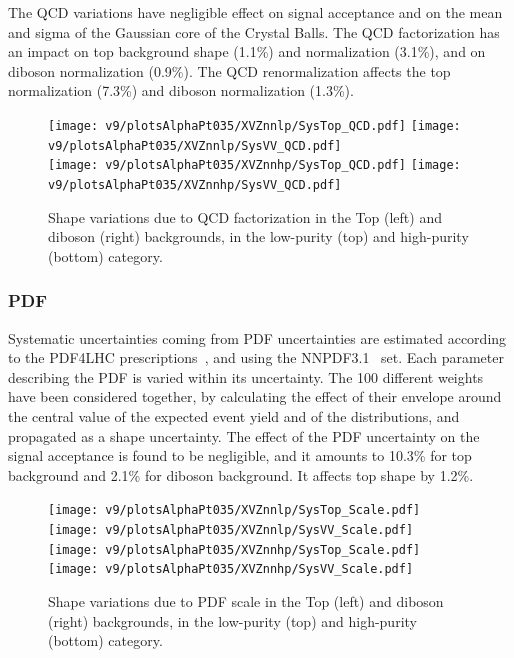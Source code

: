 \noindent The QCD variations have negligible effect on signal acceptance and on the mean and sigma of the Gaussian core of the Crystal Balls. The QCD factorization has an impact on top background shape (1.1\%) and normalization (3.1\%), and on diboson normalization (0.9\%). The QCD renormalization affects the top normalization (7.3\%) and diboson normalization (1.3\%).

 \begin{figure}[!htb]
   \begin{center}
     \texttt{[image: v9/plotsAlphaPt035/XVZnnlp/SysTop\_QCD.pdf]}
     \texttt{[image: v9/plotsAlphaPt035/XVZnnlp/SysVV\_QCD.pdf]}
     \\
     \texttt{[image: v9/plotsAlphaPt035/XVZnnhp/SysTop\_QCD.pdf]}
     \texttt{[image: v9/plotsAlphaPt035/XVZnnhp/SysVV\_QCD.pdf]}

   \end{center}
   \caption{Shape variations due to QCD factorization in the Top (left) and diboson (right) backgrounds, in the low-purity (top) and high-purity (bottom) category.}
   \label{fig:sysScale}
 \end{figure}


\subsubsection{PDF}

Systematic uncertainties coming from PDF uncertainties are estimated according to the PDF4LHC prescriptions~\cite{Butterworth:2015oua}, and using the NNPDF3.1~\cite{Ball:2017nwa} set. Each parameter describing the PDF is varied within its uncertainty. The 100 different weights have been considered together, by calculating the effect of their envelope around the central value of the expected event yield and of the \mtVZ distributions, and propagated as a shape uncertainty. The effect of the PDF uncertainty on the signal acceptance is found to be negligible, and it amounts to 10.3\% for top background and 2.1\% for diboson background. It affects top shape by 1.2\%.

 \begin{figure}[!htb]
   \begin{center}
     \texttt{[image: v9/plotsAlphaPt035/XVZnnlp/SysTop\_Scale.pdf]}
     \texttt{[image: v9/plotsAlphaPt035/XVZnnlp/SysVV\_Scale.pdf]}
     \\
     \texttt{[image: v9/plotsAlphaPt035/XVZnnhp/SysTop\_Scale.pdf]}
     \texttt{[image: v9/plotsAlphaPt035/XVZnnhp/SysVV\_Scale.pdf]}

   \end{center}
   \caption{Shape variations due to PDF scale in the Top (left) and diboson (right) backgrounds, in the low-purity (top) and high-purity (bottom) category.}
   \label{fig:sysPDF}
 \end{figure}


